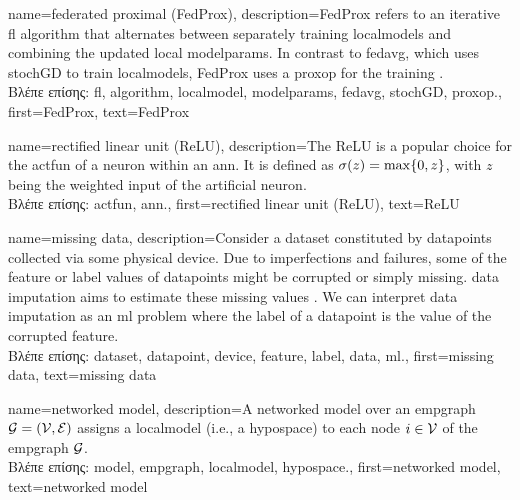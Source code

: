 {name={federated proximal (FedProx)},
	description={FedProx refers to an iterative \gls{fl} \gls{algorithm} that alternates between separately 
		training \gls{localmodel}s and combining the updated 
		local \glspl{modelparam}. In contrast to \gls{fedavg}, which uses 
		\gls{stochGD} to train \gls{localmodel}s, FedProx uses a \gls{proxop} for the training \cite{FedProx2020}.\\
		\foreignlanguage{greek}{Βλέπε επίσης:} \gls{fl}, \gls{algorithm}, \gls{localmodel}, \glspl{modelparam}, 
		\gls{fedavg}, \gls{stochGD}, \gls{proxop}.}, 
	first={FedProx}, 
	text={FedProx} 
}

{name={rectified linear unit (ReLU)},
	description={The ReLU is 
		a popular choice for the \gls{actfun} of a neuron within an \gls{ann}. It is defined 
		as $\sigma(z) = \max\{0,z\}$, with $z$ being the weighted input of the artificial 
		neuron.\\
		\foreignlanguage{greek}{Βλέπε επίσης:} \gls{actfun}, \gls{ann}.}, 
	first={rectified linear unit (ReLU)}, 
	text={ReLU} 
}

{name={missing data},
	description={Consider a \gls{dataset} constituted by \gls{datapoint}s collected via 
		some physical \gls{device}. Due to imperfections and failures, some of the \gls{feature} 
		or \gls{label} values of \gls{datapoint}s might be corrupted or simply missing. 
		\Gls{data} imputation aims to estimate these missing values \cite{Abayomi2008DiagnosticsFM}. 
		We can interpret \gls{data} imputation as an \gls{ml} problem where the \gls{label} of a \gls{datapoint} is 
		the value of the corrupted \gls{feature}.\\
		\foreignlanguage{greek}{Βλέπε επίσης:} \gls{dataset}, \gls{datapoint}, \gls{device}, \gls{feature}, \gls{label}, \gls{data}, \gls{ml}.},
	first={missing data},
	text={missing data}  
}

{name={networked model},
	description={A networked \gls{model} over an \gls{empgraph} $\mathcal{G} = \left( \mathcal{V},\mathcal{E} \right)$ assigns 
   		a \gls{localmodel} (i.e., a \gls{hypospace}) to each node $i \in \mathcal{V}$ of the \gls{empgraph} $\mathcal{G}$.\\
  	 	\foreignlanguage{greek}{Βλέπε επίσης:} \gls{model}, \gls{empgraph}, \gls{localmodel}, \gls{hypospace}.}, 
   	first={networked model},
   	text={networked model}  
}

